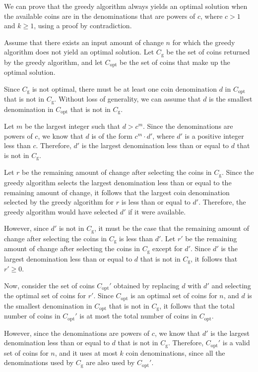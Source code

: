 \documentclass[fleqn,10pt]{olplainarticle}
\begin{document}
We can prove that the greedy algorithm always yields an optimal solution when the available coins are in the denominations that are powers of $c$, where $c > 1$ and $k \geq 1$, using a proof by contradiction.

Assume that there exists an input amount of change $n$ for which the greedy algorithm does not yield an optimal solution. Let $C_\text{g}$ be the set of coins returned by the greedy algorithm, and let $C_\text{opt}$ be the set of coins that make up the optimal solution.

Since $C_\text{g}$ is not optimal, there must be at least one coin denomination $d$ in $C_\text{opt}$ that is not in $C_\text{g}$. Without loss of generality, we can assume that $d$ is the smallest denomination in $C_\text{opt}$ that is not in $C_\text{g}$.

Let $m$ be the largest integer such that $d > c^m$. Since the denominations are powers of $c$, we know that $d$ is of the form $c^m \cdot d'$, where $d'$ is a positive integer less than $c$. Therefore, $d'$ is the largest denomination less than or equal to $d$ that is not in $C_\text{g}$.

Let $r$ be the remaining amount of change after selecting the coins in $C_\text{g}$. Since the greedy algorithm selects the largest denomination less than or equal to the remaining amount of change, it follows that the largest coin denomination selected by the greedy algorithm for $r$ is less than or equal to $d'$. Therefore, the greedy algorithm would have selected $d'$ if it were available.

However, since $d'$ is not in $C_\text{g}$, it must be the case that the remaining amount of change after selecting the coins in $C_\text{g}$ is less than $d'$. Let $r'$ be the remaining amount of change after selecting the coins in $C_\text{g}$ except for $d'$. Since $d'$ is the largest denomination less than or equal to $d$ that is not in $C_\text{g}$, it follows that $r' \geq 0$.

Now, consider the set of coins $C_\text{opt}'$ obtained by replacing $d$ with $d'$ and selecting the optimal set of coins for $r'$. Since $C_\text{opt}$ is an optimal set of coins for $n$, and $d$ is the smallest denomination in $C_\text{opt}$ that is not in $C_\text{g}$, it follows that the total number of coins in $C_\text{opt}'$ is at most the total number of coins in $C_\text{opt}$.

However, since the denominations are powers of $c$, we know that $d'$ is the largest denomination less than or equal to $d$ that is not in $C_\text{g}$. Therefore, $C_\text{opt}'$ is a valid set of coins for $n$, and it uses at most $k$ coin denominations, since all the denominations used by $C_\text{g}$ are also used by $C_\text{opt}'$.
\end{document}
